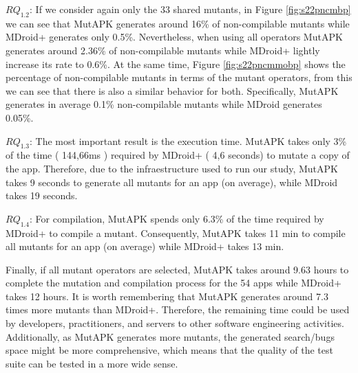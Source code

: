 \textbf{\textit{$RQ_{1.2}$}}: If we consider again only the 33 shared mutants, in Figure \ref{fig:s22pncmbp} we can see that MutAPK generates around 16\% of non-compilable mutants while MDroid+ generates only 0.5\%. Nevertheless, when using all operators MutAPK generates around 2.36\% of non-compilable mutants while MDroid+ lightly increase its rate to 0.6\%. At the same time, Figure \ref{fig:s22pncmmobp} shows the percentage of non-compilable mutants in terms of the mutant operators, from this we can see that there is also a similar behavior for both. Specifically, MutAPK generates in average 0.1\% non-compilable mutants while MDroid generates 0.05\%.

\textbf{\textit{$RQ_{1.3}$}}: The most important result is the execution time. MutAPK takes only 3\% of the time ( 144,66ms ) required by MDroid+ ( 4,6 seconds) to mutate a copy of the app. Therefore, due to the infraestructure used to run our study, MutAPK takes 9 seconds to generate all mutants for an app (on average), while MDroid takes 19 seconds. 

\textbf{\textit{$RQ_{1.4}$}}: For compilation, MutAPK spends only 6.3\% of the time required by MDroid+ to compile a mutant. Consequently, MutAPK takes 11 min to compile all mutants for an app (on average) while MDroid+ takes 13 min.


Finally, if all mutant operators are selected, MutAPK takes around 9.63 hours to complete the mutation and compilation process for the 54 apps while MDroid+ takes 12 hours.  It is worth remembering that MutAPK generates around 7.3 times more mutants than MDroid+. Therefore, the remaining time could be used by developers,  practitioners, and servers to other software engineering activities. Additionally, as MutAPK generates more mutants, the generated search/bugs space  might be more comprehensive, which means that the quality of the test suite can be tested in a more wide sense.

